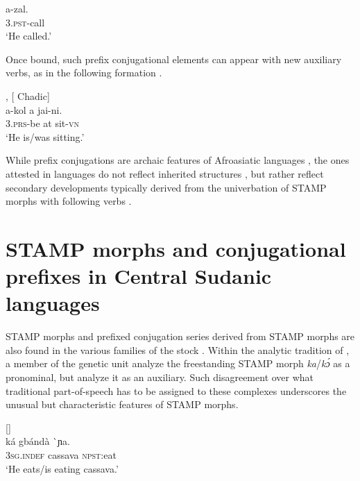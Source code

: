 \documentclass[output=paper]{langsci/langscibook}
\begin{document}
\ex \label{ex:anderson:45b}
\gll a-zal.\\
  3\textsc{.pst}-call\\
\glt `He called.'
\z
\z

Once bound, such prefix conjugational elements can appear with new auxiliary verbs, as in the following  formation .

\ea\label{ex:anderson:46}
 \citep[376]{Pawlak2001}, \citep[55]{Lukas1939}    [ Chadic]\\
\gll a-kol  a  jai-ni.\\
\textsc{3.prs}-be  at  sit\textsc{-vn}\\
\glt `He is/was sitting.' 
\z

While prefix conjugations are archaic features of Afroasiatic languages \citep{Hodge1971, Schuh1976, Mukarovsky1983, Voigt1987}, the ones attested in  languages do not reflect inherited structures \citep{Schuh1976, Voigt1989, Jungraithmayr2005, Jungraithmayr2006}, but rather reflect secondary developments typically derived from the univerbation of STAMP morphs with following verbs \citep{Caron2006, Shay2008, Anderson2011, Anderson2012}.

\section{STAMP morphs and conjugational prefixes in {Central Sudanic} languages}\label{sec:Anderson:8}

STAMP morphs and prefixed conjugation series derived from STAMP morphs are also found in the various families of the  stock \citep{Anderson2015}. Within the analytic tradition of  , a member of the  genetic unit \citet{BlackingsFabb2003} analyze the freestanding STAMP morph \textit{ka}/\textit{k\'ɔ} as a pronominal, but \citet{TuckerBryan1966} analyze it as an auxiliary. Such disagreement over what traditional part-of-speech has to be assigned to these complexes underscores the unusual but characteristic features of STAMP morphs. 

\newpage 
\ea\label{ex:anderson:47}
 \citep[13]{BlackingsFabb2003}      []\\
\ea\label{ex:anderson:47a}
\gll ká    gbándà  \`{}ɲa.  \\
  \textsc{3sg.indef}  cassava  \textsc{npst}:eat\\
\glt `He eats/is eating cassava.'      
\end{document}
